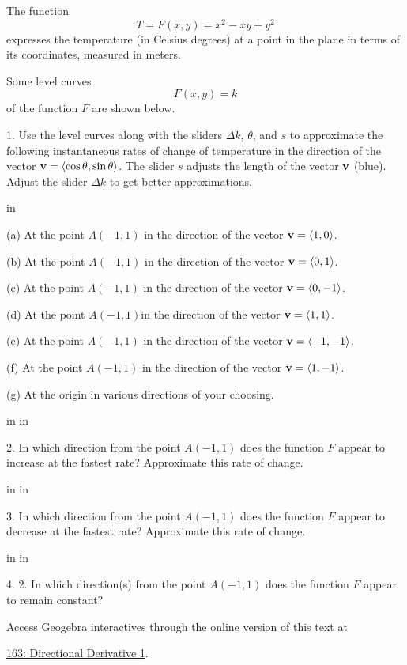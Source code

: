 \documentclass{ximera}
\newcommand{\pskip}{\vskip 0.1 in}
\begin{document}
\begin{question}  \label{Qds54546bd}

The function 
\[
     T= F(x,y) = x^2 -xy +y^2
\]
expresses the temperature (in Celsius degrees) at a point in the plane in terms of its coordinates, measured in meters.

Some level curves 
\[
     F(x,y)=k
\]
of the function $F$ are shown below. 

1. Use the level curves along with the sliders $\Delta k$, $\theta$, and $s$ to approximate the following instantaneous rates of change of temperature in the direction of the vector ${\bf v} = \langle \cos\theta, \sin\theta \rangle$. The slider $s$ adjusts the length of the vector ${\bf v}$ (blue). Adjust the slider $\Delta k$ to get better approximations.

\pskip

(a) At the point $A(-1,1)$ in the direction of the vector ${\bf v} = \langle 1, 0 \rangle$.

(b)  At the point $A(-1,1)$ in the direction of the vector ${\bf v} = \langle 0,1 \rangle$.

(c)  At the point $A(-1,1)$ in the direction of the vector ${\bf v} = \langle 0, -1 \rangle$.

(d)  At the point $A(-1,1)$in the direction of the vector ${\bf v} = \langle 1,1 \rangle$.

(e)  At the point $A(-1,1)$ in the direction of the vector ${\bf v} = \langle -1,-1 \rangle$.

(f)  At the point $A(-1,1)$ in the direction of the vector ${\bf v} = \langle 1,-1 \rangle$.

(g) At the origin in various directions of your choosing.

\pskip \pskip

2. In which direction from the point $A(-1,1)$ does the function $F$ appear to increase at the fastest rate? Approximate this rate of change.

\pskip \pskip

3. In which direction from the point $A(-1,1)$ does the function $F$ appear to decrease at the fastest rate? Approximate this rate of change.

\pskip \pskip

4. 2. In which direction(s) from the point $A(-1,1)$ does the function $F$ appear to remain constant? 


 
\begin{onlineOnly}
    \begin{center}
\end{center}
\end{onlineOnly}

Access Geogebra interactives through the online version of this text at
 
\href{https://www.geogebra.org/classic/cfkfwfpk}{163: Directional Derivative 1}.



\end{question}
\end{document}
